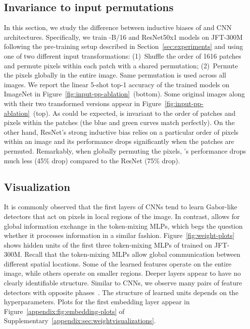 \subsection{Invariance to input permutations}
In this section, we study the difference between inductive biases of \name{} and CNN architectures.
Specifically, we train \name{}-B/16 and ResNet50x1 models on JFT-300M following the pre-training setup described in Section~\ref{sec:experiments} and using one of two different input transformations:
(1)~Shuffle the order of 1616 patches and permute pixels within each patch with a shared permutation;
(2)~Permute the pixels globally in the entire image.
Same permutation is used across all images.
We report the linear 5-shot top-1 accuracy of the trained models on ImageNet in Figure~\ref{fig:input-pp-ablation}~(bottom).
Some original images along with their two transformed versions appear in Figure~\ref{fig:input-pp-ablation}~(top).
As could be expected, \name{} is invariant to the order of patches and pixels within the patches (the blue and green curves match perfectly).
On the other hand, ResNet's strong inductive bias relies on a particular order of pixels within an image and its performance drops significantly when the patches are permuted.
Remarkably, when globally permuting the pixels, \name{}'s performance drops much less (45\% drop) compared to the ResNet (75\% drop).

\subsection{Visualization}
It is commonly observed that the first layers of CNNs tend to learn Gabor-like detectors that act on pixels in local regions of the image.
In contrast, \name{} allows for global information exchange in the token-mixing MLPs, which begs the question whether it processes information in a similar fashion.
Figure~\ref{fig:weight-plots} shows hidden units of the first three token-mixing MLPs of \name{} trained on JFT-300M. 
Recall that the token-mixing MLPs allow global communication between different spatial locations. 
Some of the learned features operate on the entire image, while others operate on smaller regions. 
Deeper layers appear to have no clearly identifiable structure. 
Similar to CNNs, we observe many pairs of 
feature detectors with opposite phases~\cite{shang2016crelu}.
The structure of learned units depends on the hyperparameters.
Plots for the first embedding layer appear in Figure~\ref{appendix:fig:embedding-plots} of Supplementary~\ref{appendix:sec:weightvisualizations}.

